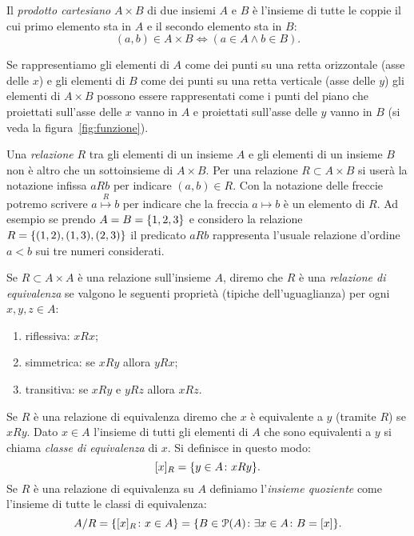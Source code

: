 Il \emph{prodotto cartesiano} $A\times B$ di due insiemi $A$ e $B$
è l'insieme di tutte le coppie
il cui primo elemento sta in $A$ e
il secondo elemento sta in $B$:
\[
  (a, b) \in A \times B \iff (a\in A \land b\in B).
\]

Se rappresentiamo gli elementi di $A$ come dei punti su una retta
orizzontale (asse delle $x$) e gli elementi di $B$ come dei punti
su una retta verticale (asse delle $y$) gli elementi di $A\times B$
possono essere rappresentati come i punti del piano che proiettati sull'asse
delle $x$ vanno in $A$ e proiettati sull'asse delle $y$ vanno in $B$
(si veda la figura~\ref{fig:funzione}). 
  
Una \emph{relazione}%
%
 $R$ tra gli elementi di un insieme $A$ e gli elementi
di un insieme $B$ non è altro che un sottoinsieme di $A\times B$.
Per una relazione $R\subset A\times B$ si userà la notazione infissa
$aRb$ per indicare $(a,b)\in R$.
Con la notazione delle freccie potremo scrivere $a \stackrel R \mapsto b$
per indicare che la freccia $a\mapsto b$ è un elemento di $R$. 
Ad esempio se prendo $A=B={\left\{ 1,2,3 \right\}}$ e considero la relazione 
$R={\left\{ (1,2),(1,3),(2,3) \right\}}$
il predicato $aRb$ rappresenta l'usuale relazione d'ordine $a<b$ sui
tre numeri considerati.

\begin{definition}
\label{def:equivalenza}%
Se $R\subset A\times A$ è una relazione sull'insieme $A$, diremo che 
$R$ è una \emph{relazione di equivalenza}%
%
 se valgono le seguenti proprietà
(tipiche dell'uguaglianza)
per ogni $x,y,z\in A$:
\begin{enumerate}
  \item riflessiva: $x R x$;
  \item simmetrica: se $x R y$ allora $y R x$;
  \item transitiva: se $x R y$ e $yRz$ allora $x R z$.
\end{enumerate}
Se $R$ è una relazione di equivalenza diremo che $x$ è equivalente a $y$ 
(tramite $R$) se $xRy$.
Dato $x \in A$ l'insieme di tutti gli elementi di $A$ che sono equivalenti 
a $y$ si chiama \emph{classe di equivalenza}%
%
 di $x$. 
Si definisce in questo modo:
\[
  [x]_R = {\left\{ y\in A \colon xRy \right\}}.  
\]
Se $R$ è una relazione di equivalenza su $A$ definiamo 
l'\emph{insieme quoziente}%
%
come l'insieme di tutte le classi di equivalenza:
\[
 A/R 
 = {\left\{ [x]_R\colon x\in A \right\}} 
 = {\left\{ B\in \mathcal P(A)\colon \exists x\in A\colon B=[x] \right\}}.  
\]
\end{definition}

